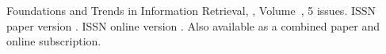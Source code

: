 \journallibraryinfo
 {%
  Foundations and Trends\textsuperscript{\textregistered} in
  Information Retrieval, ,
  Volume~, 5 issues.
  ISSN paper version .
  ISSN online version .
  Also available as a combined paper and online
  subscription.
 } 